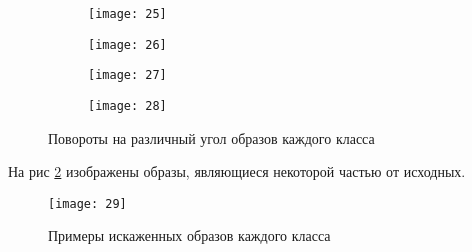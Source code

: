 \begin{figure}[H]
\begin{center}
	\begin{subfigure}[b]{\textwidth}
		\texttt{[image: 25]}
	\end{subfigure}
	\begin{subfigure}[b]{\textwidth}
		\texttt{[image: 26]}
	\end{subfigure}
	\begin{subfigure}[b]{\textwidth}
		\texttt{[image: 27]}
	\end{subfigure}
	\begin{subfigure}[b]{\textwidth}
		\texttt{[image: 28]}
	\end{subfigure}
	\caption{Повороты на различный угол образов каждого класса}
	\label{fig:digits_rotation}
\end{center}
\end{figure}

На рис \ref{fig:digits_part} изображены образы, являющиеся некоторой частью от исходных.

\begin{figure}[H]
\begin{center}
	\texttt{[image: 29]}
	\caption{Примеры искаженных образов каждого класса}
	\label{fig:digits_part}
\end{center}
\end{figure}

